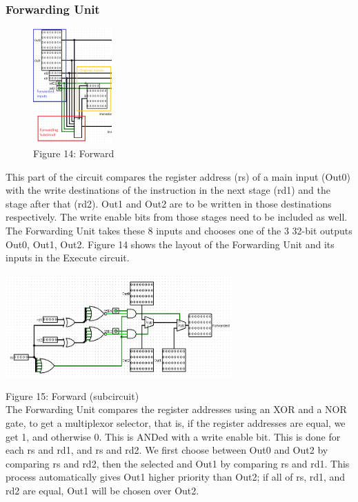 \documentclass{article}
\begin{document}
\subsubsection{Forwarding Unit}
\begin{figure}
\vspace{-1.5cm}
\begin{center}
\includegraphics[width = 0.27\textwidth]{Forward1.png} \\
Figure 14: Forward
\end{center}
\vspace{-5cm}
\end{figure}
This part of the circuit compares the register address (rs) of a main input (Out0) with the write destinations of the instruction in the next stage (rd1) and the stage after that (rd2). Out1 and Out2 are to be written in those destinations respectively. The write enable bits from those stages need to be included as well. The Forwarding Unit takes these 8 inputs and chooses one of the 3 32-bit outputs Out0, Out1, Out2. Figure 14 shows the layout of the Forwarding Unit and its inputs in the Execute circuit.

\includegraphics[width = 0.65\textwidth]{Forward2.png}

\hspace{1.5cm}Figure 15: Forward (subcircuit) \\

\noindent The Forwarding Unit compares the register addresses using an XOR and a NOR gate, to get a multiplexor selector, that is, if the register addresses are equal, we get 1, and otherwise 0. This is ANDed with a write enable bit. This is done for each rs and rd1, and rs and rd2. We first choose between Out0 and Out2 by comparing rs and rd2, then the selected and Out1 by comparing rs and rd1. This process automatically gives Out1 higher priority than Out2; if all of rs, rd1, and rd2 are equal, Out1 will be chosen over Out2. 
\end{document}
